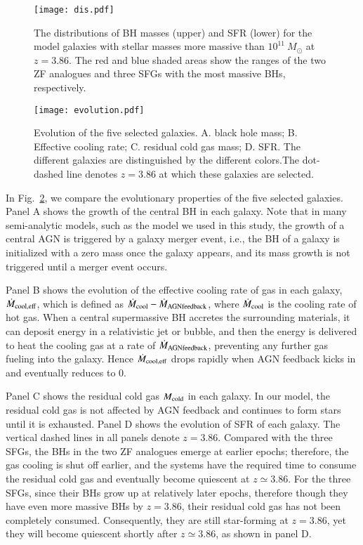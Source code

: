 \documentclass[useAMS,usenatbib]{mn2e}
\begin{document}
\begin{figure}
\centering
\texttt{[image: dis.pdf]}
\caption{The distributions of BH masses (upper) and SFR (lower) for the model galaxies with stellar masses more massive than $10^{11}\ M_{\odot}$ at $z=3.86$. The red and blue shaded areas show the ranges of the two ZF analogues and three SFGs with the most massive BHs, respectively.}
\label{property}
\end{figure}

\begin{figure}
\centering
\texttt{[image: evolution.pdf]}
\caption{Evolution of the five selected galaxies. A. black hole mass; B. Effective cooling rate; C. residual cold gas mass; D. SFR. The different galaxies are distinguished by the different colors.The dot-dashed line denotes $z=3.86$ at which these galaxies are selected.}
\label{evolution}
\end{figure}

In Fig.~\ref{evolution}, we compare the evolutionary properties of the five selected galaxies.
Panel A shows the growth of the central BH in each galaxy. Note that in many semi-analytic models, such as the model we used in this study, the growth of a central AGN is triggered by a galaxy merger event, i.e., the BH of a galaxy is initialized with a zero mass once the galaxy appears, and its mass growth is not triggered until a merger event occurs. 

Panel B shows the evolution of the effective cooling rate of gas in each galaxy, $\dot{M}_{\rm{cool,eff}}$, which is defined as $\dot{M}_{\rm{cool}}-\dot{M}_{\rm{AGNfeedback}}$, where $\dot{M}_{\rm{cool}}$ is the cooling rate of hot gas. When a central supermassive BH accretes the surrounding materials, it can deposit energy in a relativistic jet or bubble, and then the energy is delivered to heat the cooling gas at a rate of $\dot{M}_{\rm{AGNfeedback}}$, preventing any further gas fueling into the galaxy. Hence $\dot{M}_{\rm{cool,eff}}$ drops rapidly when AGN feedback kicks in and eventually reduces to 0.%

Panel C shows the residual cold gas $M_{\rm{cold}}$ in each galaxy. In our model, the residual cold gas is not affected by AGN feedback and continues to form stars until it is exhausted. Panel D shows the evolution of SFR of each galaxy. The vertical dashed lines in all panels denote $z=3.86$. Compared with the three SFGs, the BHs in the two ZF analogues emerge at earlier epochs; therefore, the gas cooling is shut off earlier, and the systems have the required time to consume the residual cold gas and eventually become quiescent at $z\simeq 3.86$. For the three SFGs, since their BHs grow up at relatively later epochs, therefore though they have even more massive BHs by $z=3.86$, their residual cold gas has not been completely consumed. Consequently, they are still star-forming at $z=3.86$, yet they will become quiescent shortly after $z\simeq 3.86$, as shown in panel D.
\end{document}
